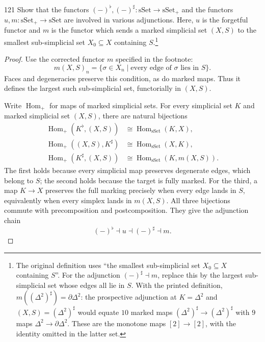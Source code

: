 \begin{exercise}{121}
Show that the functors $(-)^{\flat},(-)^{\sharp}\colon\mathrm{sSet}\to\mathrm{sSet}_+$ and the functors
$u,m\colon\allowbreak\mathrm{sSet}_+\to\mathrm{sSet}$ are involved in various adjunctions. Here, $u$ is the forgetful functor and
$m$ is the functor which sends a marked simplicial set $(X,S)$ to the smallest sub-simplicial set
$X_0\subseteq X$ containing $S$.\footnote{The original definition uses ``the smallest sub-simplicial set $X_0\subseteq X$ containing $S$''. For the adjunction $(-)^{\sharp}\dashv m$, replace this by the largest sub-simplicial set whose edges all lie in $S$. With the printed definition, $m((\Delta^2)^{\sharp})=\partial\Delta^2$: the prospective adjunction at $K=\Delta^2$ and $(X,S)=(\Delta^2)^{\sharp}$ would equate $10$ marked maps $(\Delta^2)^{\sharp}\to(\Delta^2)^{\sharp}$ with $9$ maps $\Delta^2\to\partial\Delta^2$. These are the monotone maps $[2]\to[2]$, with the identity omitted in the latter set.}

\begin{proof}
Use the corrected functor $m$ specified in the footnote:
\[
 m(X,S)_n=\{\sigma\in X_n\mid\text{every edge of }\sigma\text{ lies in }S\}.
\]
Faces and degeneracies preserve this condition, as do marked maps.
Thus it defines the largest such sub-simplicial set, functorially in $(X,S)$.

Write $\operatorname{Hom}_+$ for maps of marked simplicial sets.
For every simplicial set $K$ and marked simplicial set $(X,S)$, there are natural bijections
\[
\begin{aligned}
 \operatorname{Hom}_+(K^{\flat},(X,S))
   &\cong\operatorname{Hom}_{\mathrm{sSet}}(K,X),\\
 \operatorname{Hom}_+((X,S),K^{\sharp})
   &\cong\operatorname{Hom}_{\mathrm{sSet}}(X,K),\\
 \operatorname{Hom}_+(K^{\sharp},(X,S))
   &\cong\operatorname{Hom}_{\mathrm{sSet}}(K,m(X,S)).
\end{aligned}
\]
The first holds because every simplicial map preserves degenerate edges,
which belong to $S$; the second holds because the target is fully marked.
For the third, a map $K\to X$ preserves the full marking precisely when
every edge lands in $S$, equivalently when every simplex lands in $m(X,S)$.
All three bijections commute with precomposition and postcomposition.
They give the adjunction chain
\[
 (-)^{\flat}\dashv u\dashv(-)^{\sharp}\dashv m.
\]
\end{proof}
\end{exercise}
